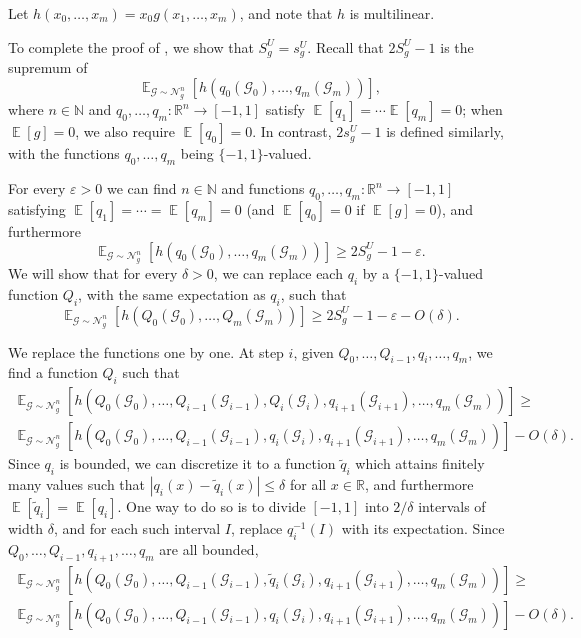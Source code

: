 \documentclass{article}
\theoremstyle{definition}
\theoremstyle{remark}
\DeclareMathOperator*{\E}{\mathbb{E}}
\providecommand{\normal}{\mathcal{N}}
\providecommand{\normalg}[1]{\normal_{#1}}
\newcommand\eps{\varepsilon}
\renewcommand\epsilon{\eps}
\renewcommand\geq{\geqslant}
\renewcommand\leq{\leqslant}
\begin{document}
Let $h(x_0,\ldots,x_m) = x_0 g(x_1,\ldots,x_m)$, and note that $h$ is multilinear.

To complete the proof of , we show that $S_g^U = s_g^U$. Recall that $2S_g^U-1$ is the supremum of
\[
 \E_{\mathcal{G} \sim \normalg{g}^n}[h(q_0(\mathcal{G}_0),\ldots,q_m(\mathcal{G}_m))],
\]
where $n \in \mathbb{N}$ and $q_0,\ldots,q_m\colon \mathbb{R}^n \to [-1,1]$ satisfy $\E[q_1] = \cdots \E[q_m] = 0$; when $\E[g] = 0$, we also require $\E[q_0] = 0$. In contrast, $2s_g^U - 1$ is defined similarly, with the functions $q_0,\ldots,q_m$ being $\{-1,1\}$-valued.

For every $\epsilon > 0$ we can find $n \in \mathbb{N}$ and functions $q_0,\ldots,q_m\colon \mathbb{R}^n \to [-1,1]$ satisfying $\E[q_1] = \cdots = \E[q_m] = 0$ (and $\E[q_0] = 0$ if $\E[g] = 0$), and furthermore
\[
 \E_{\mathcal{G} \sim \normalg{g}^n}[h(q_0(\mathcal{G}_0),\ldots,q_m(\mathcal{G}_m))] \geq 2S_g^U - 1 - \epsilon.
\]
We will show that for every $\delta > 0$, we can replace each $q_i$ by a $\{-1,1\}$-valued function $Q_i$, with the same expectation as $q_i$, such that
\[
 \E_{\mathcal{G} \sim \normalg{g}^n}[h(Q_0(\mathcal{G}_0),\ldots,Q_m(\mathcal{G}_m))] \geq 2S_g^U - 1 - \epsilon - O(\delta).
\]

We replace the functions one by one. At step $i$, given $Q_0,\ldots,Q_{i-1},q_i,\ldots,q_m$, we find a function $Q_i$ such that
\begin{multline*}
 \E_{\mathcal{G} \sim \normalg{g}^n}[h(Q_0(\mathcal{G}_0),\ldots,Q_{i-1}(\mathcal{G}_{i-1}),Q_i(\mathcal{G}_i),q_{i+1}(\mathcal{G}_{i+1}),\ldots,q_m(\mathcal{G}_m))] \geq \\
 \E_{\mathcal{G} \sim \normalg{g}^n}[h(Q_0(\mathcal{G}_0),\ldots,Q_{i-1}(\mathcal{G}_{i-1}),q_i(\mathcal{G}_i),q_{i+1}(\mathcal{G}_{i+1}),\ldots,q_m(\mathcal{G}_m))] - O(\delta).
\end{multline*}
Since $q_i$ is bounded, we can discretize it to a function $\tilde{q}_i$ which attains finitely many values such that $|q_i(x) - \tilde{q}_i(x)| \leq \delta$ for all $x \in \mathbb{R}$, and furthermore $\E[\tilde{q}_i] = \E[q_i]$. One way to do so is to divide $[-1,1]$ into $2/\delta$ intervals of width $\delta$, and for each such interval $I$, replace $q_i^{-1}(I)$ with its expectation.
Since $Q_0,\ldots,Q_{i-1},q_{i+1},\ldots,q_m$ are all bounded,
\begin{multline*}
 \E_{\mathcal{G} \sim \normalg{g}^n}[h(Q_0(\mathcal{G}_0),\ldots,Q_{i-1}(\mathcal{G}_{i-1}),\tilde{q}_i(\mathcal{G}_i),q_{i+1}(\mathcal{G}_{i+1}),\ldots,q_m(\mathcal{G}_m))] \geq \\
 \E_{\mathcal{G} \sim \normalg{g}^n}[h(Q_0(\mathcal{G}_0),\ldots,Q_{i-1}(\mathcal{G}_{i-1}),q_i(\mathcal{G}_i),q_{i+1}(\mathcal{G}_{i+1}),\ldots,q_m(\mathcal{G}_m))] - O(\delta).
\end{multline*}
\end{document}
